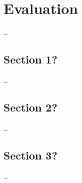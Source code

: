 
\chapter{Evaluation}
\label{ch:Evaluation}

\dots


\section{Section 1?}
\label{ch:Evaluation:sec:Section1}

\dots


\section{Section 2?}
\label{ch:Evaluation:sec:Section2}

\dots


\section{Section 3?}
\label{ch:Evaluation:sec:Section3}

\dots